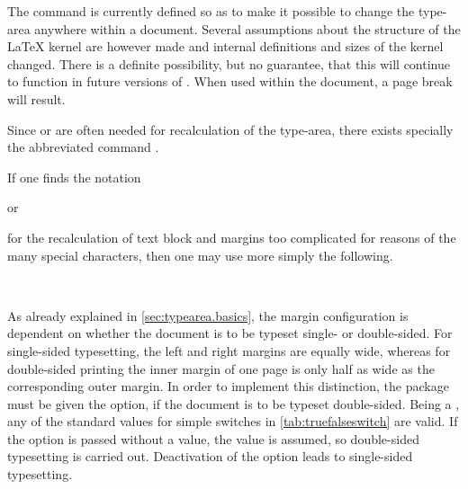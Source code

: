 \begin{Explain}
  The command  is currently defined so as to make it
  possible to change the type-area anywhere within a
  document. Several assumptions about the structure of the {\LaTeX}
  kernel are however made and internal definitions and sizes of the
  kernel changed. There is a definite possibility, but no guarantee,
  that this will continue to function in future versions of
  \LaTeXe{}. When used within the document, a page break will result.
\end{Explain}

Since  or
 are often needed for
recalculation of the type-area, there exists specially the
abbreviated command
.

\begin{Example}
  If one finds the notation
\begin{lstcode}
\end{lstcode}
  or
\begin{lstcode}
\end{lstcode}
  for the recalculation of text block and margins too complicated for
  reasons of the many special characters, then one may use more simply
  the following.
\begin{lstcode}
  \recalctypearea
\end{lstcode}
\end{Example}%
%

%
%
\begin{Declaration}
  \\
\end{Declaration}%
As already explained in \autoref{sec:typearea.basics}, the margin
configuration is dependent on whether the document is to be typeset
single- or double-sided. For single-sided typesetting, the left and
right margins are equally wide, whereas for double-sided printing the
inner margin of one page is only half as wide as the corresponding
outer margin. In order to implement this distinction, the
 package must be given the  option,
if the document is to be typeset double-sided. Being a ,
any of the standard values for simple switches in
\autoref{tab:truefalseswitch} are valid. If the option is passed
without a value, the value  is assumed, so double-sided
typesetting is carried out. Deactivation of the option leads to
single-sided typesetting.

